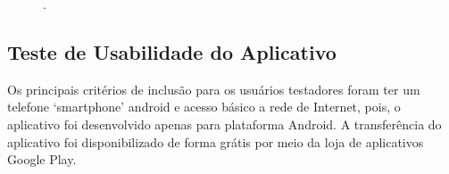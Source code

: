 \begin{figure}[H]
.
\label{figura_44}
\end{figure}


\subsection{Teste de Usabilidade do Aplicativo}

Os principais critérios de inclusão para os usuários testadores foram ter um telefone ‘smartphone’ android e acesso básico a rede de Internet, pois, o aplicativo foi desenvolvido apenas para plataforma Android. A transferência do aplicativo foi disponibilizado de forma grátis por meio da loja de aplicativos Google Play.

